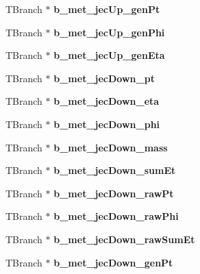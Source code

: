 \begin{DoxyCompactItemize}
T\+Branch $\ast$ {\bfseries b\+\_\+met\+\_\+jec\+Up\+\_\+gen\+Pt}
\item 
\hypertarget{classMiniTree_a71ac771441fe67118b12d08b67fc6fcb}{}\label{classMiniTree_a71ac771441fe67118b12d08b67fc6fcb} 
T\+Branch $\ast$ {\bfseries b\+\_\+met\+\_\+jec\+Up\+\_\+gen\+Phi}
\item 
\hypertarget{classMiniTree_a76ccf5b9413607a17386c0db86ac4f1f}{}\label{classMiniTree_a76ccf5b9413607a17386c0db86ac4f1f} 
T\+Branch $\ast$ {\bfseries b\+\_\+met\+\_\+jec\+Up\+\_\+gen\+Eta}
\item 
\hypertarget{classMiniTree_ad292a35d49854caa62a5798259dd163d}{}\label{classMiniTree_ad292a35d49854caa62a5798259dd163d} 
T\+Branch $\ast$ {\bfseries b\+\_\+met\+\_\+jec\+Down\+\_\+pt}
\item 
\hypertarget{classMiniTree_a6010b9305bfb84369054421ca4cb0a62}{}\label{classMiniTree_a6010b9305bfb84369054421ca4cb0a62} 
T\+Branch $\ast$ {\bfseries b\+\_\+met\+\_\+jec\+Down\+\_\+eta}
\item 
\hypertarget{classMiniTree_a68e11d7ba92557360871eec5ac6fcd41}{}\label{classMiniTree_a68e11d7ba92557360871eec5ac6fcd41} 
T\+Branch $\ast$ {\bfseries b\+\_\+met\+\_\+jec\+Down\+\_\+phi}
\item 
\hypertarget{classMiniTree_a5087fa3de26a88e91deebc4579a7b51e}{}\label{classMiniTree_a5087fa3de26a88e91deebc4579a7b51e} 
T\+Branch $\ast$ {\bfseries b\+\_\+met\+\_\+jec\+Down\+\_\+mass}
\item 
\hypertarget{classMiniTree_a69f7ea36cdfa1cf60e7f0a3f74f38609}{}\label{classMiniTree_a69f7ea36cdfa1cf60e7f0a3f74f38609} 
T\+Branch $\ast$ {\bfseries b\+\_\+met\+\_\+jec\+Down\+\_\+sum\+Et}
\item 
\hypertarget{classMiniTree_a088e24c1c5dafb5da15e02da588deedf}{}\label{classMiniTree_a088e24c1c5dafb5da15e02da588deedf} 
T\+Branch $\ast$ {\bfseries b\+\_\+met\+\_\+jec\+Down\+\_\+raw\+Pt}
\item 
\hypertarget{classMiniTree_a41101d71f480b71a8b54bccb89125e31}{}\label{classMiniTree_a41101d71f480b71a8b54bccb89125e31} 
T\+Branch $\ast$ {\bfseries b\+\_\+met\+\_\+jec\+Down\+\_\+raw\+Phi}
\item 
\hypertarget{classMiniTree_ac50e0a926393bbe5bc73d291bdeb8418}{}\label{classMiniTree_ac50e0a926393bbe5bc73d291bdeb8418} 
T\+Branch $\ast$ {\bfseries b\+\_\+met\+\_\+jec\+Down\+\_\+raw\+Sum\+Et}
\item 
\hypertarget{classMiniTree_acc92eb63203a186f9f261b029bd9520a}{}\label{classMiniTree_acc92eb63203a186f9f261b029bd9520a} 
T\+Branch $\ast$ {\bfseries b\+\_\+met\+\_\+jec\+Down\+\_\+gen\+Pt}

\end{DoxyCompactItemize}
